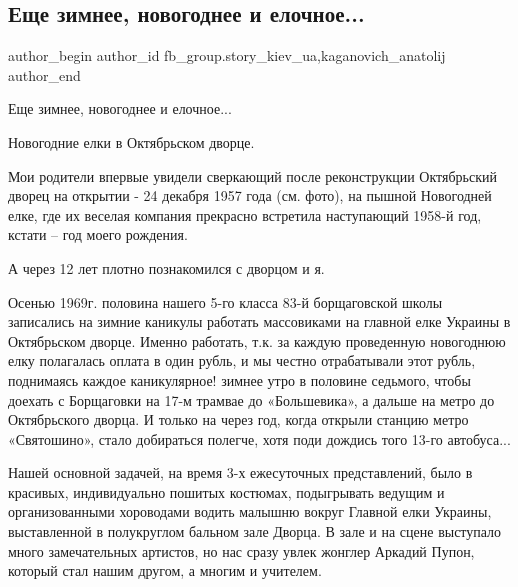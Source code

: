  
 
 
 
 
 
\subsection{Еще зимнее, новогоднее и елочное...}
\label{sec:01_01_2022.fb.fb_group.story_kiev_ua.2.zimnee}
 
\ifcmt
 author_begin
   author_id fb_group.story_kiev_ua,kaganovich_anatolij
 author_end
\fi

Еще зимнее, новогоднее и елочное... 

Новогодние елки в Октябрьском дворце.

Мои родители впервые увидели сверкающий после реконструкции Октябрьский дворец
на открытии - 24 декабря 1957 года (см. фото), на пышной Новогодней елке, где
их веселая компания прекрасно встретила наступающий 1958-й год, кстати – год
моего рождения.

А через 12 лет плотно познакомился с дворцом и я.

Осенью 1969г. половина нашего 5-го класса 83-й борщаговской школы записались на
зимние каникулы работать массовиками на главной елке Украины в Октябрьском
дворце. Именно работать, т.к. за каждую проведенную новогоднюю елку полагалась
оплата в один рубль, и мы честно отрабатывали этот рубль, поднимаясь каждое
каникулярное! зимнее утро в половине седьмого, чтобы доехать с Борщаговки на
17-м трамвае до «Большевика», а дальше на метро до Октябрьского дворца. И
только на через год, когда открыли станцию метро «Святошино», стало добираться
полегче, хотя поди дождись того 13-го автобуса...

Нашей основной задачей, на время 3-х ежесуточных представлений, было в
красивых, индивидуально пошитых костюмах, подыгрывать ведущим и организованными
хороводами водить малышню вокруг Главной елки Украины, выставленной в
полукруглом бальном зале Дворца. В зале и на сцене выступало много
замечательных артистов, но нас сразу увлек жонглер Аркадий Пупон, который стал
нашим другом, а многим и учителем.

